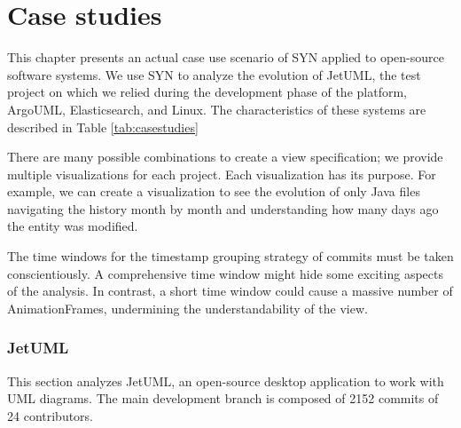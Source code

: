 
\chapter[Case studies]{Case studies}
\graphicspath{ {images/casestudies} }

This chapter presents an actual case use scenario of SYN applied to open-source software systems. 
We use SYN to analyze the evolution of JetUML, the test project on which we relied during the development phase of the platform, ArgoUML, Elasticsearch, and Linux. 
The characteristics of these systems are described in Table \ref{tab:casestudies}



\bigbreak
There are many possible combinations to create a view specification; we provide multiple visualizations for each project. 
Each visualization has its purpose. For example, we can create a visualization to see the evolution of only Java files navigating the history 
month by month and understanding how many days ago the entity was modified. 

The time windows for the timestamp grouping strategy of commits must be taken conscientiously. 
A comprehensive time window might hide some exciting aspects of the analysis. In contrast, a short time window could cause a massive number of AnimationFrames, undermining the understandability of the view. 


\subsection*{JetUML}
This section analyzes JetUML, an open-source desktop application to work with UML diagrams.
The main development branch is composed of 2152 commits of 24 contributors. 
\newpage
